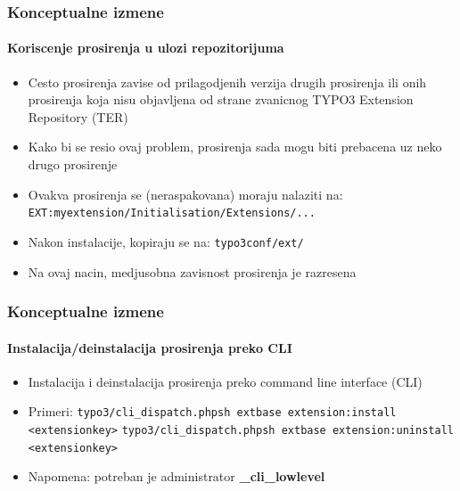 
\begin{frame}[fragile]
	\frametitle{Konceptualne izmene}
	\framesubtitle{Koriscenje prosirenja u ulozi repozitorijuma}

	\begin{itemize}
		\item Cesto prosirenja zavise od prilagodjenih verzija drugih prosirenja ili onih prosirenja koja nisu objavljena od strane zvanicnog TYPO3 Extension Repository (TER)
		\item Kako bi se resio ovaj problem, prosirenja sada mogu biti prebacena uz neko drugo prosirenje
		\item Ovakva prosirenja se (neraspakovana) moraju nalaziti na:\newline
			\texttt{EXT:myextension/Initialisation/Extensions/...}

		\item Nakon instalacije, kopiraju se na:\newline
			\texttt{typo3conf/ext/}

		\item Na ovaj nacin, medjusobna zavisnost prosirenja je razresena

	\end{itemize}

\end{frame}


\begin{frame}[fragile]
	\frametitle{Konceptualne izmene}
	\framesubtitle{Instalacija/deinstalacija prosirenja preko CLI}

	\begin{itemize}
		\item Instalacija i deinstalacija prosirenja preko command line interface (CLI)
		\item Primeri:
			\lstinline!typo3/cli_dispatch.phpsh extbase extension:install <extensionkey>!
			\lstinline!typo3/cli_dispatch.phpsh extbase extension:uninstall <extensionkey>!

		\item Napomena: potreban je administrator \textbf{\_cli\_lowlevel}
	\end{itemize}

\end{frame}

